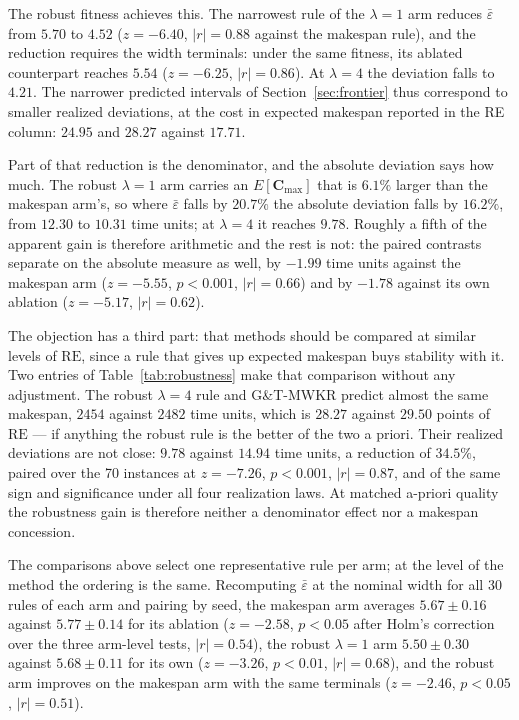 \documentclass[review,authoryear,11pt]{elsarticle}
\newcommand{\rev}[1]{\textcolor{revcolor}{#1}}
\newcommand{\RE}{\mathrm{RE}}
\begin{document}
The robust fitness achieves this. The narrowest rule of the
$\lambda{=}1$ arm reduces $\bar\varepsilon$ from $5.70$ to $4.52$
($z=-6.40$, $|r|=0.88$ against the makespan rule), and the reduction requires the
width terminals: under the same fitness, its ablated counterpart reaches
$5.54$ ($z=-6.25$, $|r|=0.86$). At $\lambda{=}4$ the deviation falls to $4.21$. The
narrower predicted intervals of Section~\ref{sec:frontier} thus
correspond to smaller realized deviations, at the cost in expected
makespan reported in the RE column: $24.95$ and $28.27$ against
$17.71$.

\rev{Part of that reduction is the denominator, and the absolute
deviation says how much. The robust $\lambda{=}1$ arm carries an
$E[\mathbf{C}_{\max}]$ that is $6.1\%$ larger than the makespan arm's, so where
$\bar\varepsilon$ falls by $20.7\%$ the absolute deviation falls by
$16.2\%$, from $12.30$ to $10.31$ time units; at $\lambda{=}4$ it
reaches $9.78$. Roughly a fifth of the apparent gain is therefore
arithmetic and the rest is not: the paired contrasts separate on the
absolute measure as well, by $-1.99$ time units against the makespan
arm ($z=-5.55$, $p<0.001$, $|r|=0.66$) and by $-1.78$ against its own
ablation ($z=-5.17$, $|r|=0.62$).}

\rev{The objection has a third part: that methods should be compared at
similar levels of $\RE$, since a rule that gives up expected makespan
buys stability with it. Two entries of
Table~\ref{tab:robustness} make that comparison without any adjustment.
The robust $\lambda{=}4$ rule and G\&T-MWKR predict almost the same
makespan, $2454$ against $2482$ time units, which is $28.27$ against
$29.50$ points of $\RE$ --- if anything the robust rule is the better of
the two a priori. Their realized deviations are not close: $9.78$ against
$14.94$ time units, a reduction of $34.5\%$, paired over the 70
instances at $z=-7.26$, $p<0.001$, $|r|=0.87$, and of the same sign and
significance under all four realization laws. At matched a-priori
quality the robustness gain is therefore neither a denominator effect
nor a makespan concession.}

The comparisons above select one representative rule per arm; at the
level of the method the ordering is the same. Recomputing
$\bar\varepsilon$ at the nominal width for all 30 rules of each arm
and pairing by seed, the makespan arm averages $5.67 \pm 0.16$ against
$5.77 \pm 0.14$ for its ablation ($z=-2.58$, $p<0.05$ after Holm's
correction over the three arm-level tests, $|r|=0.54$), the robust
$\lambda{=}1$ arm $5.50 \pm 0.30$ against $5.68 \pm 0.11$ for its own
($z=-3.26$, $p<0.01$, $|r|=0.68$), and the robust arm improves on the
makespan arm with the same terminals ($z=-2.46$, $p<0.05$, $|r|=0.51$).
\end{document}
